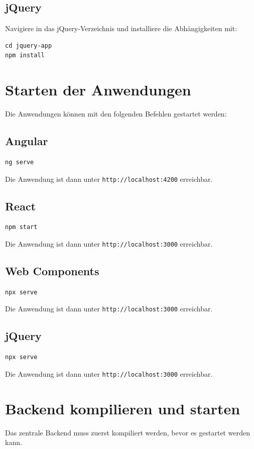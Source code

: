 \documentclass[oneside]{ausarbeitung}
\begin{document}
\subsection{jQuery}
Navigiere in das jQuery-Verzeichnis und installiere die Abhängigkeiten mit:
\begin{verbatim}
cd jquery-app
npm install
\end{verbatim}

\section{Starten der Anwendungen}
Die Anwendungen können mit den folgenden Befehlen gestartet werden:

\subsection{Angular}
\begin{verbatim}
ng serve
\end{verbatim}
Die Anwendung ist dann unter \texttt{http://localhost:4200} erreichbar.

\subsection{React}
\begin{verbatim}
npm start
\end{verbatim}
Die Anwendung ist dann unter \texttt{http://localhost:3000} erreichbar.

\subsection{Web Components}
\begin{verbatim}
npx serve
\end{verbatim}
Die Anwendung ist dann unter \texttt{http://localhost:3000} erreichbar.

\subsection{jQuery}
\begin{verbatim}
npx serve
\end{verbatim}
Die Anwendung ist dann unter \texttt{http://localhost:3000} erreichbar.

\section{Backend kompilieren und starten}
Das zentrale Backend muss zuerst kompiliert werden, bevor es gestartet werden kann.
\end{document}

